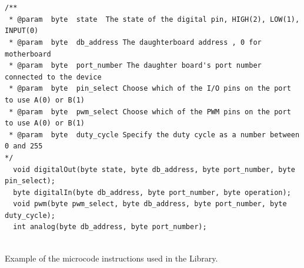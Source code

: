 	\begin{listing}
		\footnotesize
		\begin{verbatim}
	

/**
 * @param  byte  state  The state of the digital pin, HIGH(2), LOW(1), INPUT(0)
 * @param  byte  db_address The daughterboard address , 0 for motherboard 
 * @param  byte  port_number The daughter board's port number connected to the device
 * @param  byte  pin_select Choose which of the I/O pins on the port to use A(0) or B(1)
 * @param  byte  pwm_select Choose which of the PWM pins on the port to use A(0) or B(1)
 * @param  byte  duty_cycle Specify the duty cycle as a number between 0 and 255
*/
  void digitalOut(byte state, byte db_address, byte port_number, byte pin_select);
  byte digitalIn(byte db_address, byte port_number, byte operation);
  void pwm(byte pwm_select, byte db_address, byte port_number, byte duty_cycle);
  int analog(byte db_address, byte port_number);
	
		\end{verbatim}
		\caption{Example of the \xten microcode instructions used in the Library.} \label{code:micro}
	\end{listing}

